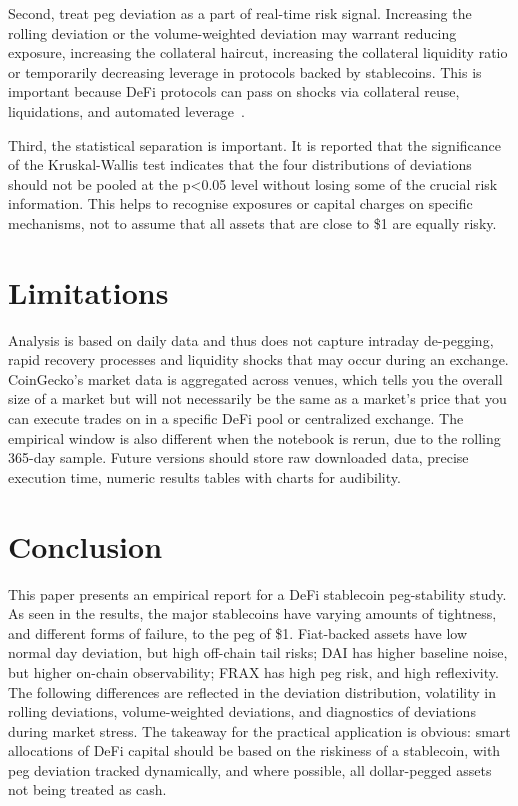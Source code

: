 \documentclass[conference]{IEEEtran}
\begin{document}
Second, treat peg deviation as a part of real-time risk signal. Increasing the rolling deviation or the volume-weighted deviation may warrant reducing exposure, increasing the collateral haircut, increasing the collateral liquidity ratio or temporarily decreasing leverage in protocols backed by stablecoins. This is important because DeFi protocols can pass on shocks via collateral reuse, liquidations, and automated leverage~\cite{schar_2021_defi,bis_2022_future_monetary,imf_2021_gfsr}.

Third, the statistical separation is important. It is reported that the significance of the Kruskal-Wallis test indicates that the four distributions of deviations should not be pooled at the p<0.05 level without losing some of the crucial risk information. This helps to recognise exposures or capital charges on specific mechanisms, not to assume that all assets that are close to \$1 are equally risky.

\section{Limitations}
Analysis is based on daily data and thus does not capture intraday de-pegging, rapid recovery processes and liquidity shocks that may occur during an exchange. CoinGecko's market data is aggregated across venues, which tells you the overall size of a market but will not necessarily be the same as a market's price that you can execute trades on in a specific DeFi pool or centralized exchange. The empirical window is also different when the notebook is rerun, due to the rolling 365-day sample. Future versions should store raw downloaded data, precise execution time, numeric results tables with charts for audibility.

\section{Conclusion}
This paper presents an empirical report for a DeFi stablecoin peg-stability study. As seen in the results, the major stablecoins have varying amounts of tightness, and different forms of failure, to the peg of \$1. Fiat-backed assets have low normal day deviation, but high off-chain tail risks; DAI has higher baseline noise, but higher on-chain observability; FRAX has high peg risk, and high reflexivity. The following differences are reflected in the deviation distribution, volatility in rolling deviations, volume-weighted deviations, and diagnostics of deviations during market stress. The takeaway for the practical application is obvious: smart allocations of DeFi capital should be based on the riskiness of a stablecoin, with peg deviation tracked dynamically, and where possible, all dollar-pegged assets not being treated as cash.
\end{document}
